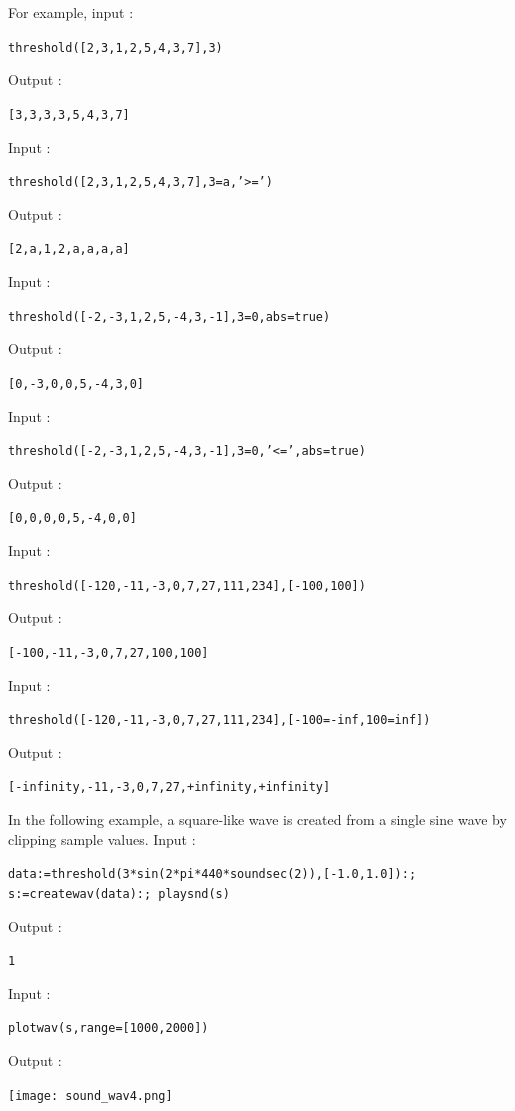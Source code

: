 \documentclass[a4paper,11pt]{book}
\begin{document}
For example, input :
\begin{center}
	{\tt threshold([2,3,1,2,5,4,3,7],3)}
\end{center}
Output :
\begin{center}
	{\tt [3,3,3,3,5,4,3,7]}
\end{center}
Input :
\begin{center}
	{\tt threshold([2,3,1,2,5,4,3,7],3=a,'>=')}
\end{center}
Output :
\begin{center}
	{\tt [2,a,1,2,a,a,a,a]}
\end{center}
Input :
\begin{center}
	{\tt threshold([-2,-3,1,2,5,-4,3,-1],3=0,abs=true)}
\end{center}
Output :
\begin{center}
	{\tt [0,-3,0,0,5,-4,3,0]}
\end{center}
Input :
\begin{center}
	{\tt threshold([-2,-3,1,2,5,-4,3,-1],3=0,'<=',abs=true)}
\end{center}
Output :
\begin{center}
	{\tt [0,0,0,0,5,-4,0,0]}
\end{center}
Input :
\begin{center}
	{\tt threshold([-120,-11,-3,0,7,27,111,234],[-100,100])}
\end{center}
Output :
\begin{center}
	{\tt [-100,-11,-3,0,7,27,100,100]}
\end{center}
Input :
\begin{center}
	{\tt threshold([-120,-11,-3,0,7,27,111,234],[-100=-inf,100=inf])}
\end{center}
Output :
\begin{center}
	{\tt [-infinity,-11,-3,0,7,27,+infinity,+infinity]}
\end{center}

In the following example, a square-like wave is created from a single sine wave by clipping sample values. Input :
\begin{center}
  \tt data:=threshold(3*sin(2*pi*440*soundsec(2)),[-1.0,1.0]):;\\s:=createwav(data):; playsnd(s)
\end{center}
Output :
\begin{center}
  \tt 1
\end{center}
Input :
\begin{center}
  \tt plotwav(s,range=[1000,2000])
\end{center}
Output :
\begin{center}
  \texttt{[image: sound\_wav4.png]}
\end{center}
\end{document}
